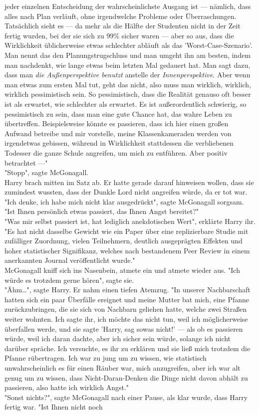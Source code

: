 {jeder einzelnen Entscheidung der wahrscheinlichste Ausgang ist --- nämlich, dass alles nach Plan verläuft, ohne irgendwelche Probleme oder Überraschungen. Tatsächlich sieht es --- da mehr als die Hälfte der Studenten nicht in der Zeit fertig wurden, bei der sie sich zu 99\% sicher waren --- aber so aus, dass die Wirklichkeit üblicherweise etwas schlechter abläuft als das 'Worst-Case-Szenario'. Man nennt das den Planungstrugschluss und man umgeht ihn am besten, indem man nachdenkt, wie lange etwas beim letzten Mal gedauert hat. Man sagt dazu, dass man \emph{die Außenperspektive benutzt} anstelle der \emph{Innenperspektive}. Aber wenn man etwas zum ersten Mal tut, geht das nicht, also muss man wirklich, wirklich, wirklich pessimistisch sein. So pessimistisch, dass die Realität genauso oft besser ist als erwartet, wie schlechter als erwartet. Es ist außerordentlich schwierig, so pessimistisch zu sein, dass man eine gute Chance hat, das wahre Leben zu übertreffen. Beispielsweise könnte es passieren, dass ich hier einen großen Aufwand betreibe und mir vorstelle, meine Klassenkameraden werden von irgendetwas gebissen, während in Wirklichkeit stattdessen die verbliebenen Todesser die ganze Schule angreifen, um mich zu entführen. Aber positiv betrachtet ---"\\ "Stopp", sagte McGonagall.\\ Harry brach mitten im Satz ab. Er hatte gerade darauf hinweisen wollen, dass sie zumindest wussten, dass der Dunkle Lord nicht angreifen würde, da er tot war.\\ "Ich denke, ich habe mich nicht klar ausgedrückt", sagte McGonagall sorgsam. "Ist Ihnen persönlich etwas passiert, das Ihnen Angst bereitet?"\\ "Was mir selbst passiert ist, hat lediglich anekdotischen Wert", erklärte Harry ihr. "Es hat nicht dasselbe Gewicht wie ein Paper über eine replizierbare Studie mit zufälliger Zuordnung, vielen Teilnehmern, deutlich ausgeprägten Effekten und hoher statistischer Signifikanz, welches nach bestandenem Peer Review in einem anerkannten Journal veröffentlicht wurde."\\ McGonagall kniff sich ins Nasenbein, atmete ein und atmete wieder aus. "Ich würde es trotzdem gerne hören", sagte sie.\\ "Ähm…", sagte Harry. Er nahm einen tiefen Atemzug. "In unserer Nachbarschaft hatten sich ein paar Überfälle ereignet und meine Mutter bat mich, eine Pfanne zurückzubringen, die sie sich von Nachbarn geliehen hatte, welche zwei Straßen weiter wohnten. Ich sagte ihr, ich möchte das nicht tun, weil ich möglicherweise überfallen werde, und sie sagte 'Harry, sag sowas nicht!' --- als ob es passieren würde, weil ich daran dachte, aber ich sicher sein würde, solange ich nicht darüber spräche. Ich versuchte, es ihr zu erklären und sie ließ mich trotzdem die Pfanne rübertragen. Ich war zu jung um zu wissen, wie statistisch unwahrscheinlich es für einen Räuber war, mich anzugreifen, aber ich war alt genug um zu wissen, dass Nicht-Daran-Denken die Dinge nicht davon abhält zu passieren, also hatte ich wirklich Angst."\\ "Sonst nichts?", sagte McGonagall nach einer Pause, als klar wurde, dass Harry fertig war. "Ist Ihnen nicht noch }
